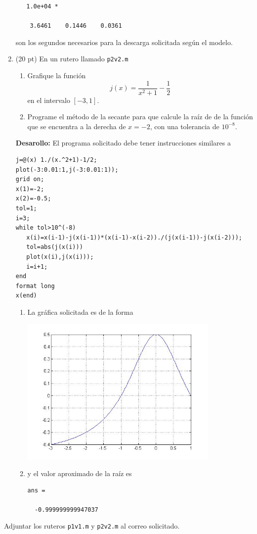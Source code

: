 \documentclass[11pt]{article}
\begin{document}
\begin{enumerate}
\begin{lstlisting}
   1.0e+04 *

    3.6461    0.1446    0.0361

\end{lstlisting}
son los segundos necesarios para la descarga solicitada según el modelo. \fbox{10pt}

\newpage
\item (20 pt) En un rutero llamado \texttt{p2v2.m}
\begin{enumerate}
\item Grafique la funci\'on
$$
j(x)=\frac{1}{x^2+1}-\frac{1}{2}
$$
en el intervalo $[-3,1]$.
\item Programe el m\'etodo de la secante para que calcule la ra\'iz de de la funci\'on que se encuentra a la derecha de $x=-2$, con una tolerancia de $10^{-8}$.
\end{enumerate}
\textbf{Desarollo:} 
El programa solicitado debe tener instrucciones similares a 
\begin{lstlisting}
j=@(x) 1./(x.^2+1)-1/2;
plot(-3:0.01:1,j(-3:0.01:1));
grid on;
x(1)=-2;
x(2)=-0.5;
tol=1;
i=3;
while tol>10^(-8)
   x(i)=x(i-1)-j(x(i-1))*(x(i-1)-x(i-2))./(j(x(i-1))-j(x(i-2)));
   tol=abs(j(x(i)))
   plot(x(i),j(x(i)));
   i=i+1;
end
format long
x(end)
\end{lstlisting}

\fbox{10pt}
\begin{enumerate}
	\item La gr\'afica solicitada es de la forma
    \begin{center}
    \includegraphics[width=0.8\textwidth]{./p2v2.jpg}
    \fbox{5pt}
    \end{center}
    \item y el valor aproximado de la ra\'iz es
    \begin{lstlisting}
ans =

  -0.999999999947037
    \end{lstlisting} \fbox{5pt}
\end{enumerate}
\end{enumerate}
Adjuntar los ruteros \texttt{p1v1.m} y \texttt{p2v2.m} al correo solicitado.
\end{document}
